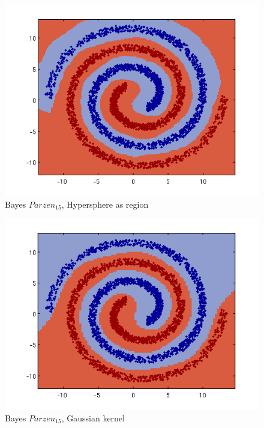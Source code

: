 \documentclass[a4paper]{article}
\begin{document}
\begin{figure}[htbp!]
\center
\includegraphics[clip, trim=40px 15px 30px 10px]{parzen_nls_sphere.png}
\caption{Bayes $Parzen_{15}$, Hypersphere as region}
\end{figure}

\begin{figure}[htbp!]
\center
\includegraphics[clip, trim=40px 15px 30px 10px]{parzen_nls_gauss.png}
\caption{Bayes $Parzen_{15}$, Gaussian kernel}
\end{figure}
\end{document}
